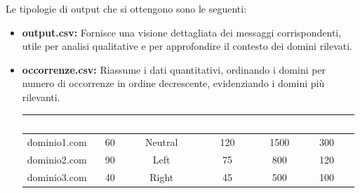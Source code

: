 \documentclass[12pt]{article}
\begin{document}
	Le tipologie di output che si ottengono sono le seguenti:
	\begin{itemize}[label=]
		\item \textbf{output.csv:} Fornisce una visione dettagliata dei messaggi corrispondenti, utile per analisi qualitative e per approfondire il contesto dei domini rilevati.
		\item \textbf{occorrenze.csv:} Riassume i dati quantitativi, ordinando i domini per numero di occorrenze in ordine decrescente, evidenziando i domini più rilevanti.
		\begin{table}[h!]
			\centering
			\renewcommand{\arraystretch}{1.5}
			\setlength{\tabcolsep}{12pt}
			\begin{tabular}{|c|c|c|c|c|c|}
				\hline
				\rowcolor{darkblue!80} \textcolor{white}{\textbf{Domain}} & \textcolor{white}{\textbf{Score}} & \textcolor{white}{\textbf{Orientation}} & \textcolor{white}{\textbf{Occorrenze}} & \textcolor{white}{\textbf{Views}} & \textcolor{white}{\textbf{Forwards}} \\ \hline
				dominio1.com & 60 & Neutral & 120 & 1500 & 300 \\ \hline
				dominio2.com & 90 & Left   & 75  & 800  & 120 \\ \hline
				dominio3.com & 40 & Right  & 45  & 500  & 100 \\ \hline
			\end{tabular}
		\end{table}
	\end{itemize}
\end{document}
